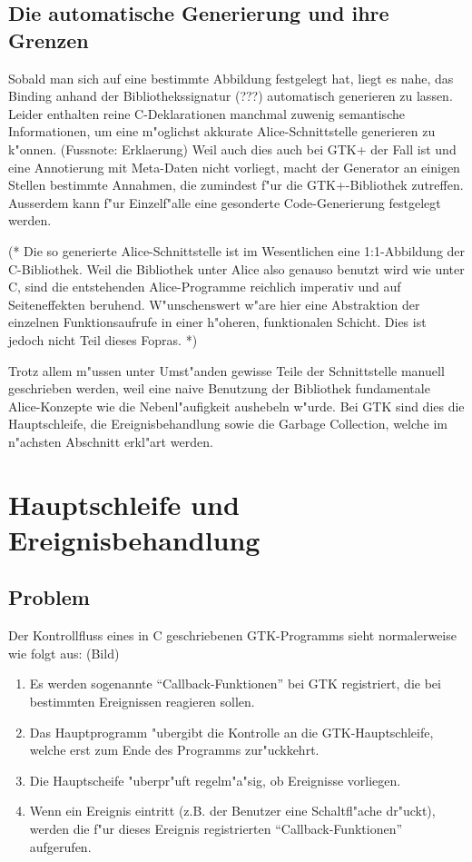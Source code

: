 \documentclass{article}
\begin{document}
\subsection{Die automatische Generierung und ihre Grenzen}

Sobald man sich auf eine bestimmte Abbildung festgelegt hat, liegt es nahe,
das Binding anhand der Bibliothekssignatur (???) automatisch generieren zu
lassen. Leider enthalten reine C-Deklarationen manchmal zuwenig semantische
Informationen, um eine m"oglichst akkurate Alice-Schnittstelle generieren
zu k"onnen. (Fussnote: Erklaerung) Weil auch dies auch bei GTK+ der Fall
ist und eine Annotierung mit Meta-Daten nicht vorliegt, macht der Generator
an einigen Stellen bestimmte Annahmen, die zumindest f"ur die GTK+-Bibliothek
zutreffen. Ausserdem kann f"ur Einzelf"alle eine gesonderte Code-Generierung
festgelegt werden.

(*
Die so generierte Alice-Schnittstelle ist im Wesentlichen eine 1:1-Abbildung
der C-Bibliothek. Weil die Bibliothek unter Alice also genauso benutzt wird
wie unter C, sind die entstehenden Alice-Programme reichlich imperativ und auf
Seiteneffekten beruhend. W"unschenswert w"are hier eine Abstraktion der
einzelnen Funktionsaufrufe in einer h"oheren, funktionalen Schicht.
Dies ist jedoch nicht Teil dieses Fopras.
*)

Trotz allem m"ussen unter Umst"anden gewisse Teile der Schnittstelle manuell
geschrieben werden, weil eine naive Benutzung der Bibliothek fundamentale
Alice-Konzepte wie die Nebenl"aufigkeit aushebeln w"urde. Bei GTK sind
dies die Hauptschleife, die Ereignisbehandlung sowie die Garbage Collection,
welche im n"achsten Abschnitt erkl"art werden.

\section{Hauptschleife und Ereignisbehandlung}

\subsection{Problem}

Der Kontrollfluss eines in C geschriebenen GTK-Programms sieht normalerweise
wie folgt aus: (Bild)

\begin{enumerate}
\item Es werden sogenannte ``Callback-Funktionen'' bei GTK registriert, die
      bei bestimmten Ereignissen reagieren sollen.
\item Das Hauptprogramm "ubergibt die Kontrolle an die GTK-Hauptschleife,
      welche erst zum Ende des Programms zur"uckkehrt.
\item Die Hauptscheife "uberpr"uft regelm"a"sig, ob Ereignisse vorliegen.
\item Wenn ein Ereignis eintritt (z.B. der Benutzer eine Schaltfl"ache 
      dr"uckt), werden die f"ur dieses Ereignis registrierten
      ``Callback-Funktionen'' aufgerufen.
\end{enumerate}
\end{document}
